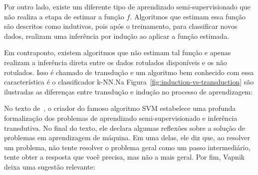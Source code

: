 Por outro lado, existe um diferente tipo de aprendizado
semi-supervisionado que não realiza a etapa de estimar a função $ f
$. Algoritmos que estimam essa função são descritos como indutivos,
pois após o treinamento, para classificar novos dados, realizam uma
inferência por indução ao aplicar a função estimada.

Em contraponto, existem algoritmos que não estimam tal função e apenas
realizam a inferência direta entre os dados rotulados disponíveis e os
não rotulados. Isso é chamado de transdução e um algoritmo bem
conhecido com essa característica é o classificador \gls{k-NN}.\@ Na
Figura~\ref{fig:induction-vs-transduction} são ilustradas as
diferenças entre transdução e indução no processo de aprendizagem:


\begin{figure}[h!]
        \captionsetup{width=12cm}
		\centering
        {}
\end{figure}


No texto de~, o criador do famoso algoritmo SVM
estabelece uma profunda formalização dos problemas de aprendizado
semi-supervisionado e inferência transdutiva. No final do texto, ele
declara algumas reflexões sobre a solução de problemas em aprendizagem
de máquina. Em uma delas, ele diz que, ao resolver um problema, não
tente resolver o problema geral como um passo intermediário, tente
obter a resposta que você precisa, mas não a mais geral. Por fim,
Vapnik deixa uma sugestão relevante:


